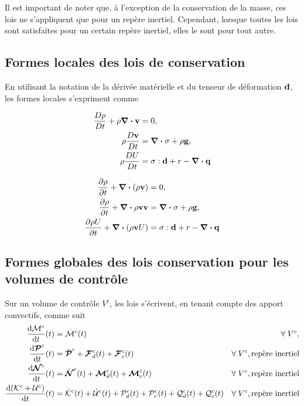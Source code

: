       Il est important de noter que, à l'exception de la conservation de la masse, ces lois ne s'appliquent que pour un repère inertiel. Cependant, lorsque toutes les lois sont satisfaites pour un certain repère inertiel, elles le sont pour tout autre.

    \subsection{Formes locales des lois de conservation}
      En utilisant la notation de la dérivée matérielle et du tenseur de déformation $\vb{d}$, les formes locales s'expriment comme
      \begin{multicols}{2}
        \begin{align}
          \frac{D \rho}{D t} + \rho \div \vb{v} &= 0, \nonumber\\
          \rho \frac{D \vb{v}}{D t} &= \div \sigma + \rho \vb{g},\nonumber\\
          \rho \frac{D U}{D t} &= \vb{\sigma} : \vb{d} + r - \div \vb{q} \nonumber
        \end{align}

        \begin{align}
          \pdv{\rho}{t} + \div (\rho \vb{v}) &= 0, \nonumber \\
          \pdv{\rho}{t} + \div {\rho \vb{v} \vb{v}} &= \div \vb{\sigma} + \rho \vb{g}, \\
          \pdv{\rho U}{t} + \div (\rho \vb{v} U) &= \vb{\sigma} : \vb{d} + r - \div \vb{q} \nonumber
        \end{align}

      \end{multicols}

    \subsection{Formes globales des lois conservation pour les volumes de contrôle}
      Sur un volume de contrôle $V^c$, les lois s'écrivent, en tenant compte des apport convectifs, comme suit
      \begin{equation}\begin{aligned}
        \dv{\mathcal{M}^c}{t} {} (t) &= \dot{\mathcal{M}}^c(t) & \forall \; V^c, \\
        \dv{\boldsymbol{\mathcal{P}}^c}{t} {} (t) &= \dot{\boldsymbol{\mathcal{P}}}^c + \boldsymbol{\mathcal{F}}^c_d(t) + \boldsymbol{\mathcal{F}}^c_c(t) & \forall \; V^c, \textrm{repère inertiel} \\
        \dv{\boldsymbol{\mathcal{N}}^c}{t} {} (t) &= \dot{\boldsymbol{\mathcal{N}}}^c(t) + \boldsymbol{\mathcal{M}}^c_d(t) + \boldsymbol{\mathcal{M}}^c_c(t) & \forall \; V^c, \textrm{repère inertiel} \\
        \dv{(\mathcal{K}^c + \mathcal{U}^c)}{t} {}(t) &= \dot{\mathcal{K}}^c (t) + \dot{\mathcal{U}}^c(t) + \mathcal{P}^c_d(t) + \mathcal{P}^c_c(t) + \mathcal{Q}^c_d (t) + \mathcal{Q}^c_c (t) &  \forall \; V^c, \textrm{repère inertiel}
      \end{aligned}\end{equation}

